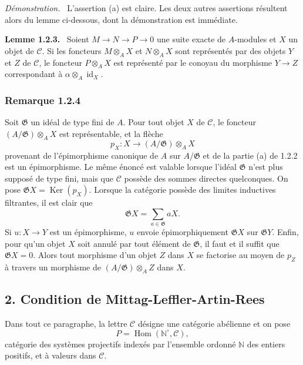 \documentclass[11pt]{article}
\providecommand{\NN}{\mathbb{N}}
\newenvironment{statement}[1]{\par\medskip\noindent\textbf{#1.}\ }{\par\medskip}
\newenvironment{prooftext}[1][Proof]{\par\noindent\emph{#1.}\ }{\par\medskip}
\DeclareMathOperator{\Hom}{Hom}
\providecommand{\Ker}{\operatorname{Ker}}
\providecommand{\id}{\operatorname{id}}
\providecommand{\Hom}{\operatorname{Hom}}
\providecommand{\NN}{\mathbb N}
\providecommand{\cC}{\mathcal C}
\providecommand{\cG}{\mathfrak G}
\providecommand{\id}{\operatorname{id}}
\providecommand{\Ker}{\operatorname{Ker}}
\providecommand{\Ker}{\operatorname{Ker}}
\providecommand{\id}{\operatorname{id}}
\providecommand{\id}{\operatorname{id}}
\providecommand{\id}{\operatorname{id}}
\providecommand{\cC}{\mathcal C}
\begin{document}
\begin{prooftext}[Démonstration]
L'assertion (a) est claire. Les deux autres assertions résultent alors du lemme ci-dessous, dont la démonstration est immédiate.
\end{prooftext}

\begin{statement}{Lemme 1.2.3}
Soient $M\to N\to P\to0$ une suite exacte de $A$-modules et $X$ un objet de $\cC$. Si les foncteurs $M\otimes_A X$ et $N\otimes_A X$ sont représentés par des objets $Y$ et $Z$ de $\cC$, le foncteur $P\otimes_A X$ est représenté par le conoyau du morphisme $Y\to Z$ correspondant à $\alpha\otimes_A\id_X$.
\end{statement}

\subsubsection*{Remarque 1.2.4}
Soit $\cG$ un idéal de type fini de $A$. Pour tout objet $X$ de $\cC$, le foncteur $(A/\cG)\otimes_A X$ est représentable, et la flèche
\[
p_X:X\longrightarrow (A/\cG)\otimes_A X
\]
provenant de l'épimorphisme canonique de $A$ sur $A/\cG$ et de la partie (a) de 1.2.2 est un épimorphisme. Le même énoncé est valable lorsque l'idéal $\cG$ n'est plus supposé de type fini, mais que $\cC$ possède des sommes directes quelconques. On pose $\cG X=\Ker(p_X)$. Lorsque la catégorie possède des limites inductives filtrantes, il est clair que
\[
\cG X=\sum_{a\in\cG}aX.
\]
Si $u:X\to Y$ est un épimorphisme, $u$ envoie épimorphiquement $\cG X$ sur $\cG Y$. Enfin, pour qu'un objet $X$ soit annulé par tout élément de $\cG$, il faut et il suffit que $\cG X=0$. Alors tout morphisme d'un objet $Z$ dans $X$ se factorise au moyen de $p_Z$ à travers un morphisme de $(A/\cG)\otimes_A Z$ dans $X$.

\subsection*{2. Condition de Mittag-Leffler-Artin-Rees}
Dans tout ce paragraphe, la lettre $\cC$ désigne une catégorie abélienne et on pose
\[
P=\Hom(\NN^\circ,\cC),
\]
catégorie des systèmes projectifs indexés par l'ensemble ordonné $\NN$ des entiers positifs, et à valeurs dans $\cC$.
\end{document}
